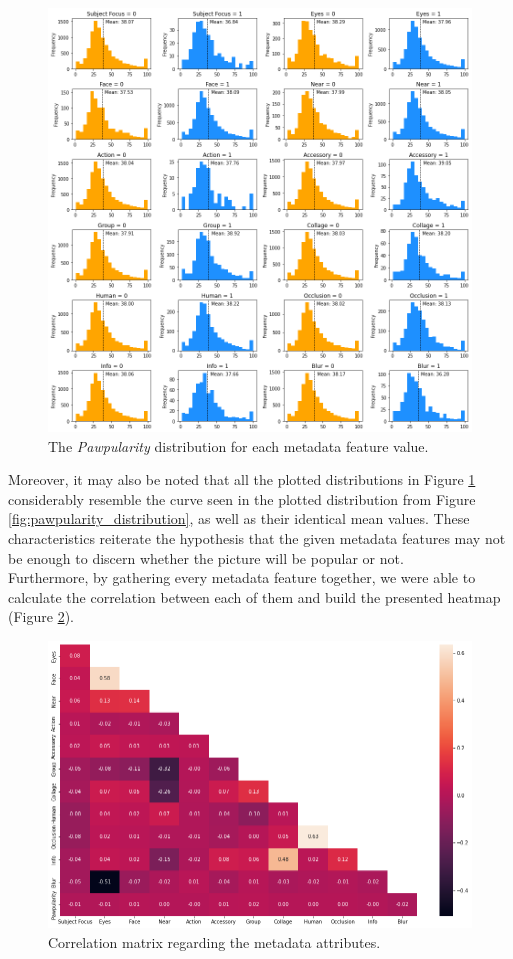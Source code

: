 \documentclass{article}
\begin{document}
\begin{figure}[h!]
    \centering
    \includegraphics[width=\linewidth]{figs/metadata_analysis.png}
    \caption{The \textit{Pawpularity} distribution for each metadata feature value.}
    \label{fig:metadata_analysis}
\end{figure}

\vspace{0.3cm}Moreover, it may also be noted that all the plotted distributions in Figure \ref{fig:metadata_analysis} considerably resemble the curve seen in the plotted distribution from Figure \ref{fig:pawpularity_distribution}, as well as their identical mean values. These characteristics reiterate the hypothesis that the given metadata features may not be enough to discern whether the picture will be popular or not.\\
Furthermore, by gathering every metadata feature together, we were able to calculate the correlation between each of them and build the presented heatmap (Figure \ref{fig:correlation}).

\begin{figure}[h!]
    \centering
    \includegraphics[width=0.8\linewidth]{figs/correlation.png}
    \caption{Correlation matrix regarding the metadata attributes.}
    \label{fig:correlation}
\end{figure}
\end{document}
